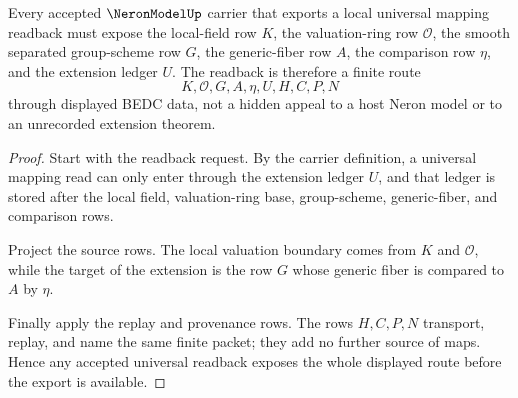 \begin{theorem}
\label{thm:neron-model-local-universal-route}
Every accepted $\NeronModelUp$ carrier that exports a local universal mapping readback must expose the local-field row $K$, the valuation-ring row $\mathcal O$, the smooth separated group-scheme row $G$, the generic-fiber row $A$, the comparison row $\eta$, and the extension ledger $U$. The readback is therefore a finite route
$$
K,\mathcal O,G,A,\eta,U,H,C,P,N
$$
through displayed BEDC data, not a hidden appeal to a host Neron model or to an unrecorded extension theorem.
\end{theorem}
\begin{proof}
Start with the readback request. By the carrier definition, a universal mapping read can only enter through the extension ledger $U$, and that ledger is stored after the local field, valuation-ring base, group-scheme, generic-fiber, and comparison rows.

Project the source rows. The local valuation boundary comes from $K$ and $\mathcal O$, while the target of the extension is the row $G$ whose generic fiber is compared to $A$ by $\eta$.

Finally apply the replay and provenance rows. The rows $H,C,P,N$ transport, replay, and name the same finite packet; they add no further source of maps. Hence any accepted universal readback exposes the whole displayed route before the export is available.
\end{proof}


\begin{closurestatus}{\NeronModelUp}
  \theoryclosure{\seedClosure}
  \formalstatus{\unformalizedV}
\end{closurestatus}
